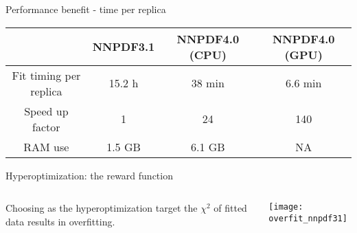 \begin{frame}{Performance benefit - time per replica}
\begin{table}
   \renewcommand{\arraystretch}{1.50}
  \centering
  \begin{tabular}{c | c | c | c} \toprule
    & NNPDF3.1  & NNPDF4.0 (CPU) & NNPDF4.0  (GPU) \\
          \midrule
    Fit timing per replica    & 15.2 h        & 38 min        & 6.6 min \\ \hline
           Speed up factor    & 1        &  24      & 140 \\ \hline
    RAM use &  1.5 GB          &  6.1 GB                 & NA  \\ \bottomrule
  \end{tabular}
\end{table}
\vspace*{1em}
\end{frame}

\begin{frame}[t]{Hyperoptimization: the reward function}
  \begin{columns}[T]
      \begin{column}{0.48\textwidth}
          \vspace{\topsep}
          Choosing as the hyperoptimization target the $\chi^2$ of fitted data results in overfitting.
      \end{column}
      \begin{column}{0.48\textwidth}
          \texttt{[image: overfit\_nnpdf31]}
      \end{column}
  \end{columns}
\end{frame}



